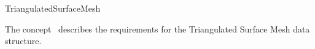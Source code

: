 
\begin{ccRefConcept}{TriangulatedSurfaceMesh}


\ccDefinition

The concept \ccRefName\ describes the requirements for the Triangulated Surface Mesh data structure.

\ccRefines
{}


\ccOperations


\end{ccRefConcept}
